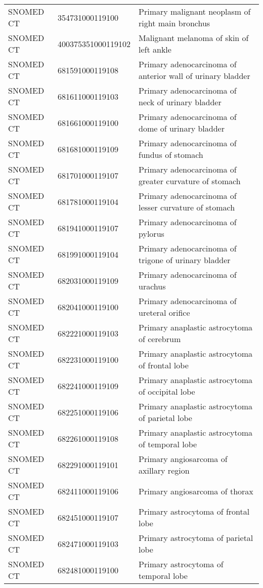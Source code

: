 \begin{longtable}{p{}p{}p{}}
  SNOMED CT & 354731000119100 & Primary malignant neoplasm of right main bronchus \\ 
  SNOMED CT & 400375351000119102 & Malignant melanoma of skin of left ankle \\ 
  SNOMED CT & 681591000119108 & Primary adenocarcinoma of anterior wall of urinary bladder \\ 
  SNOMED CT & 681611000119103 & Primary adenocarcinoma of neck of urinary bladder \\ 
  SNOMED CT & 681661000119100 & Primary adenocarcinoma of dome of urinary bladder \\ 
  SNOMED CT & 681681000119109 & Primary adenocarcinoma of fundus of stomach \\ 
  SNOMED CT & 681701000119107 & Primary adenocarcinoma of greater curvature of stomach \\ 
  SNOMED CT & 681781000119104 & Primary adenocarcinoma of lesser curvature of stomach \\ 
  SNOMED CT & 681941000119107 & Primary adenocarcinoma of pylorus \\ 
  SNOMED CT & 681991000119104 & Primary adenocarcinoma of trigone of urinary bladder \\ 
  SNOMED CT & 682031000119109 & Primary adenocarcinoma of urachus \\ 
  SNOMED CT & 682041000119100 & Primary adenocarcinoma of ureteral orifice \\ 
  SNOMED CT & 682221000119103 & Primary anaplastic astrocytoma of cerebrum \\ 
  SNOMED CT & 682231000119100 & Primary anaplastic astrocytoma of frontal lobe \\ 
  SNOMED CT & 682241000119109 & Primary anaplastic astrocytoma of occipital lobe \\ 
  SNOMED CT & 682251000119106 & Primary anaplastic astrocytoma of parietal lobe \\ 
  SNOMED CT & 682261000119108 & Primary anaplastic astrocytoma of temporal lobe \\ 
  SNOMED CT & 682291000119101 & Primary angiosarcoma of axillary region \\ 
  SNOMED CT & 682411000119106 & Primary angiosarcoma of thorax \\ 
  SNOMED CT & 682451000119107 & Primary astrocytoma of frontal lobe \\ 
  SNOMED CT & 682471000119103 & Primary astrocytoma of parietal lobe \\ 
  SNOMED CT & 682481000119100 & Primary astrocytoma of temporal lobe \\ 

\end{longtable}
